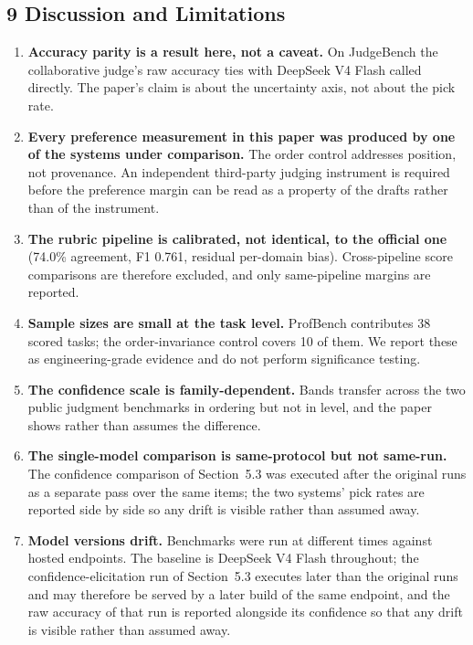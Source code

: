 \documentclass[
]{article}
\providecommand{\tightlist}{%
  \setlength{\itemsep}{0pt}\setlength{\parskip}{0pt}}
\begin{document}
\subsection{9 Discussion and Limitations}\label{limitations}

\begin{enumerate}
\def\labelenumi{\arabic{enumi}.}
\tightlist
\item
  \textbf{Accuracy parity is a result here, not a caveat.} On JudgeBench the
  collaborative judge's raw accuracy ties with DeepSeek V4 Flash called directly. The paper's
  claim is about the uncertainty axis, not about the pick rate.
\item
  \textbf{Every preference measurement in this paper was produced by one of the systems
  under comparison.} The order control addresses position, not provenance. An
  independent third-party judging instrument is required before the preference margin
  can be read as a property of the drafts rather than of the instrument.
\item
  \textbf{The rubric pipeline is calibrated, not identical, to the official one}
  (74.0\% agreement, F1 0.761, residual per-domain bias). Cross-pipeline score
  comparisons are therefore excluded, and only same-pipeline margins are reported.
\item
  \textbf{Sample sizes are small at the task level.} ProfBench contributes 38 scored
  tasks; the order-invariance control covers 10 of them. We report these as
  engineering-grade evidence and do not perform significance testing.
\item
  \textbf{The confidence scale is family-dependent.} Bands transfer across the two
  public judgment benchmarks in ordering but not in level, and the paper shows rather
  than assumes the difference.
\item
  \textbf{The single-model comparison is same-protocol but not same-run.} The confidence
  comparison of Section~5.3 was executed after the original runs as a separate pass over
  the same items; the two systems' pick rates are reported side by side so any drift is
  visible rather than assumed away.
\item
  \textbf{Model versions drift.} Benchmarks were run at different times against hosted
  endpoints. The baseline is DeepSeek V4 Flash throughout; the confidence-elicitation
  run of Section~5.3 executes later than the original runs and may therefore be served
  by a later build of the same endpoint, and the raw accuracy of that run is reported
  alongside its confidence so that any drift is visible rather than assumed away.
\end{enumerate}
\end{document}
